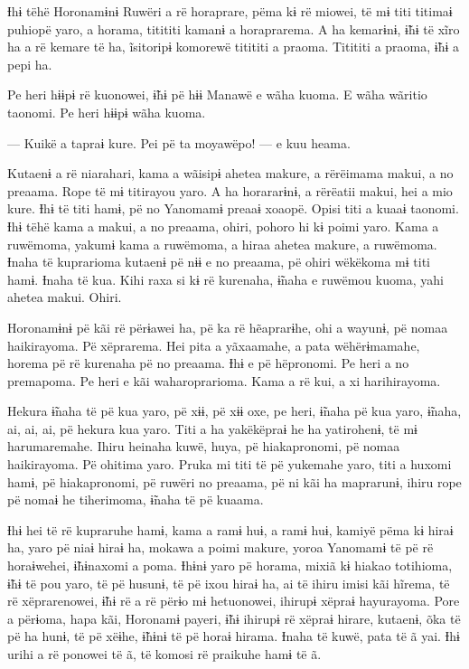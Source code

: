 Ɨhɨ tëhë Horonamɨnɨ Ruwëri a rë horaprare, pëma kɨ rë miowei, të mɨ titi
titimaɨ puhiopë yaro, a horama, titititi kamanɨ a horaprarema. A ha
kemarɨnɨ, ɨ̃hɨ të xĩro ha a rë kemare të ha, ĩsitoripɨ komorewë titititi
a praoma. Titititi a praoma, ɨ̃hɨ a pepi ha. 

Pe heri hɨɨpɨ rë kuonowei, ɨ̃hɨ pë hɨɨ Manawë e wãha kuoma. E wãha
wãritio taonomi. Pe heri hɨɨpɨ wãha kuoma. 

--- Kuikë a tapraɨ kure. Pei pë ta moyawëpo! --- e kuu heama. 

Kutaenɨ a rë niarahari, kama a wãisipɨ ahetea makure, a rërëimama makui,
a no preaama. Rope të mɨ titirayou yaro. A ha horararɨnɨ, a rërëatii
makui, hei a mio kure. Ɨhɨ të titi hamɨ, pë no Yanomamɨ preaaɨ xoaopë.
Opisi titi a kuaaɨ taonomi. Ɨhɨ tëhë kama a makui, a no preaama, ohiri,
pohoro hi kɨ poimi yaro. Kama a ruwëmoma, yakumɨ kama a ruwëmoma, a
hiraa ahetea makure, a ruwëmoma. Ɨnaha të kuprarioma kutaenɨ pë nɨɨ e no
preaama, pë ohiri wëkëkoma mɨ titi hamɨ. Ɨnaha të kua. Kihi raxa si kɨ
rë kurenaha, ɨ̃naha e ruwëmou kuoma, yahi ahetea makui. Ohiri. 

Horonamɨnɨ pë kãi rë përɨawei ha, pë ka rë hẽaprarɨhe, ohi a wayunɨ, pë
nomaa haikirayoma. Pë xëprarema. Hei pita a yãxaamahe, a pata
wëhërɨmamahe, horema pë rë kurenaha pë no preaama. Ɨhɨ e pë hëpronomi.
Pe heri a no premapoma. Pe heri e kãi waharoprarioma. Kama a rë kui, a
xi harihirayoma. 

Hekura ɨ̃naha të pë kua yaro, pë xɨɨ, pë xɨɨ oxe, pe heri, ɨ̃naha pë kua
yaro, ɨ̃naha, ai, ai, ai, pë hekura kua yaro. Titi a ha yakëkëpraɨ he ha
yatirohenɨ, të mɨ harumaremahe. Ihiru heinaha kuwë, huya, pë
hiakapronomi, pë nomaa haikirayoma. Pë ohitima yaro. Pruka mi titi të pë
yukemahe yaro, titi a huxomi hamɨ, pë hiakapronomi, pë ruwëri no
preaama, pë ni kãi ha maprarunɨ, ihiru rope pë nomaɨ he tiherimoma,
ɨ̃naha të pë kuaama. 

Ɨhɨ hei të rë kupraruhe hamɨ, kama a ramɨ huɨ, a ramɨ huɨ, kamiyë pëma
kɨ hiraɨ ha, yaro pë niaɨ hiraɨ ha, mokawa a poimi makure, yoroa
Yanomamɨ të pë rë horaɨwehei, ɨ̃hɨnaxomi a poma. Ɨhɨnɨ yaro pë horama,
mixiã kɨ hiakao totihioma, ɨ̃hɨ të pou yaro, të pë husunɨ, të pë ixou
hiraɨ ha, ai të ihiru imisi kãi hĩrema, të rë xëprarenowei, ɨ̃hɨ rë a rë
përɨo mɨ hetuonowei, ihirupɨ xëpraɨ hayurayoma. Pore a përɨoma, hapa
kãi, Horonamɨ payeri, ɨ̃hɨ ihirupɨ rë xëpraɨ hirare, kutaenɨ, õka të pë
ha hunɨ, të pë xëɨhe, ɨ̃hɨnɨ të pë horaɨ hirama. Ɨnaha të kuwë, pata të ã
yai. Ɨhɨ urihi a rë ponowei të ã, të komosi rë praikuhe hamɨ të ã.

